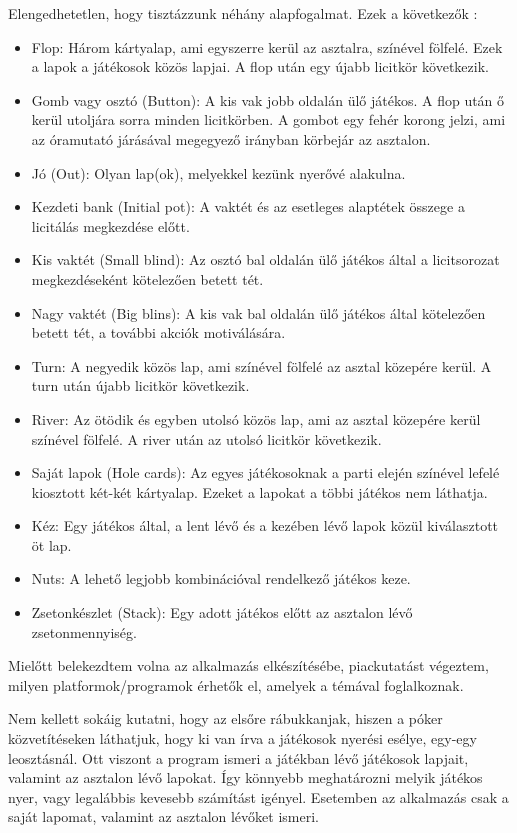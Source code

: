 Elengedhetetlen, hogy tisztázzunk néhány alapfogalmat. Ezek a következők \cite{harrington}:
\begin{itemize}
\item Flop: Három kártyalap, ami egyszerre kerül az asztalra, színével fölfelé. Ezek a lapok a játékosok közös lapjai. A flop után egy újabb licitkör következik.
\item Gomb vagy osztó (Button): A kis vak jobb oldalán ülő játékos. A flop után ő kerül utoljára sorra minden licitkörben. A gombot egy fehér korong jelzi, ami az óramutató járásával megegyező irányban körbejár az asztalon.
\item Jó (Out): Olyan lap(ok), melyekkel kezünk nyerővé alakulna.
\item Kezdeti bank (Initial pot): A vaktét és az esetleges alaptétek összege a licitálás megkezdése előtt.
\item Kis vaktét (Small blind): Az osztó bal oldalán ülő játékos által a licitsorozat megkezdéseként kötelezően betett tét.
\item Nagy vaktét (Big blins): A kis vak bal oldalán ülő játékos által kötelezően betett tét, a további akciók motiválására.
\item Turn: A negyedik közös lap, ami színével fölfelé az asztal közepére kerül. A turn után újabb licitkör következik.
\item River: Az ötödik és egyben utolsó közös lap, ami az asztal közepére kerül színével fölfelé. A river után az utolsó licitkör következik.
\item Saját lapok (Hole cards): Az egyes játékosoknak a parti elején színével lefelé kiosztott két-két kártyalap. Ezeket a lapokat a többi játékos nem láthatja.
\item Kéz: Egy játékos által, a lent lévő és a kezében lévő lapok közül kiválasztott öt lap.
\item Nuts: A lehető legjobb kombinációval rendelkező játékos keze.
\item Zsetonkészlet (Stack): Egy adott játékos előtt az asztalon lévő zsetonmennyiség.
\end{itemize}


Mielőtt belekezdtem volna az alkalmazás elkészítésébe, piackutatást végeztem, milyen platformok/programok érhetők el, amelyek a témával foglalkoznak.

Nem kellett sokáig kutatni, hogy az elsőre rábukkanjak, hiszen a póker közvetítéseken láthatjuk, hogy ki van írva a játékosok nyerési esélye, egy-egy leosztásnál. Ott viszont a program ismeri a játékban lévő játékosok lapjait, valamint az asztalon lévő lapokat. Így könnyebb meghatározni melyik játékos nyer, vagy legalábbis kevesebb számítást igényel. Esetemben az alkalmazás csak a saját lapomat, valamint az asztalon lévőket ismeri.

